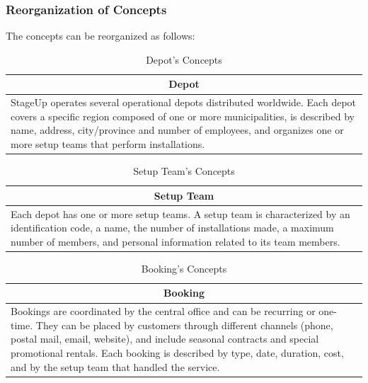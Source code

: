 \subsubsection{Reorganization of Concepts}

The concepts can be reorganized as follows:

\begin{table}[H]
    \renewcommand{\arraystretch}{1.25}
    \begin{tabularx}{\textwidth}{|X|}
    \hline
    \multicolumn{1}{|c|}{\textbf{Depot}} \\
    \hline
    StageUp operates several operational depots distributed worldwide. Each depot covers a specific region composed of one or more municipalities, is described by name, address, city/province and number of employees, and organizes one or more setup teams that perform installations. \\
    \hline
    \end{tabularx}
    \caption{Depot's Concepts}
\end{table}

\begin{table}[H]
    \renewcommand{\arraystretch}{1.25}
    \begin{tabularx}{\textwidth}{|X|}
    \hline
    \multicolumn{1}{|c|}{\textbf{Setup Team}} \\
    \hline
    Each depot has one or more setup teams. A setup team is characterized by an identification code, a name, the number of installations made, a maximum number of members, and personal information related to its team members. \\
    \hline
    \end{tabularx}
    \caption{Setup Team's Concepts}
\end{table}

\begin{table}[H]
    \renewcommand{\arraystretch}{1.25}
    \begin{tabularx}{\textwidth}{|X|}
    \hline
    \multicolumn{1}{|c|}{\textbf{Booking}} \\
    \hline
    Bookings are coordinated by the central office and can be recurring or one-time. They can be placed by customers through different channels (phone, postal mail, email, website), and include seasonal contracts and special promotional rentals. Each booking is described by type, date, duration, cost, and by the setup team that handled the service. \\
    \hline
    \end{tabularx}
    \caption{Booking's Concepts}
\end{table}

